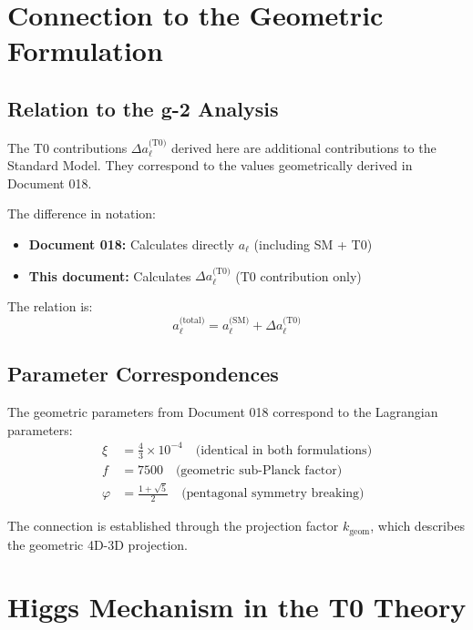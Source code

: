	\section{Connection to the Geometric Formulation}
	
	\subsection{Relation to the g-2 Analysis}
	
	The T0 contributions $\Delta a_\ell^{\text{(T0)}}$ derived here are additional contributions to the Standard Model. They correspond to the values geometrically derived in Document 018.
	
	The difference in notation:
	\begin{itemize}
		\item \textbf{Document 018:} Calculates directly $a_\ell$ (including SM + T0)
		\item \textbf{This document:} Calculates $\Delta a_\ell^{\text{(T0)}}$ (T0 contribution only)
	\end{itemize}
	
	The relation is:
	\begin{equation}
		a_\ell^{\text{(total)}} = a_\ell^{\text{(SM)}} + \Delta a_\ell^{\text{(T0)}}
		\label{eq:total_relation}
	\end{equation}
	
	\subsection{Parameter Correspondences}
	
	The geometric parameters from Document 018 correspond to the Lagrangian parameters:
	\begin{align}
		\xi &= \frac{4}{3} \times 10^{-4} \quad \text{(identical in both formulations)} \label{eq:xi_correspondence} \\
		f &= 7500 \quad \text{(geometric sub-Planck factor)} \label{eq:f_correspondence} \\
		\varphi &= \frac{1+\sqrt{5}}{2} \quad \text{(pentagonal symmetry breaking)} \label{eq:phi_correspondence}
	\end{align}
	
	The connection is established through the projection factor $k_{\text{geom}}$, which describes the geometric 4D-3D projection.
	
	\section{Higgs Mechanism in the T0 Theory}
	
